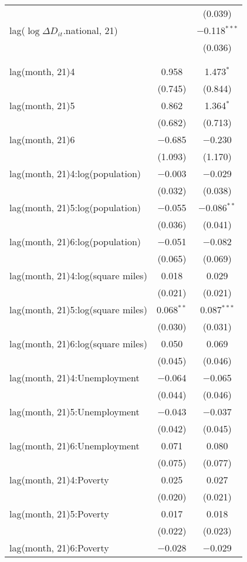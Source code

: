 \begin{tabular}{@{\extracolsep{1pt}}lcc}
  &  & (0.039) \\ 
  lag($\log \Delta D_{it}$.national, 21) &  & $-$0.118$^{***}$ \\ 
  &  & (0.036) \\ 
   &  &  \\ 
  &  &  \\ 
  lag(month, 21)4 & 0.958 & 1.473$^{*}$ \\ 
  & (0.745) & (0.844) \\ 
  lag(month, 21)5 & 0.862 & 1.364$^{*}$ \\ 
  & (0.682) & (0.713) \\ 
  lag(month, 21)6 & $-$0.685 & $-$0.230 \\ 
  & (1.093) & (1.170) \\ 
  lag(month, 21)4:log(population) & $-$0.003 & $-$0.029 \\ 
  & (0.032) & (0.038) \\ 
  lag(month, 21)5:log(population) & $-$0.055 & $-$0.086$^{**}$ \\ 
  & (0.036) & (0.041) \\ 
  lag(month, 21)6:log(population) & $-$0.051 & $-$0.082 \\ 
  & (0.065) & (0.069) \\ 
  lag(month, 21)4:log(square miles) & 0.018 & 0.029 \\ 
  & (0.021) & (0.021) \\ 
  lag(month, 21)5:log(square miles) & 0.068$^{**}$ & 0.087$^{***}$ \\ 
  & (0.030) & (0.031) \\ 
  lag(month, 21)6:log(square miles) & 0.050 & 0.069 \\ 
  & (0.045) & (0.046) \\ 
  lag(month, 21)4:Unemployment & $-$0.064 & $-$0.065 \\ 
  & (0.044) & (0.046) \\ 
  lag(month, 21)5:Unemployment & $-$0.043 & $-$0.037 \\ 
  & (0.042) & (0.045) \\ 
  lag(month, 21)6:Unemployment & 0.071 & 0.080 \\ 
  & (0.075) & (0.077) \\ 
  lag(month, 21)4:Poverty & 0.025 & 0.027 \\ 
  & (0.020) & (0.021) \\ 
  lag(month, 21)5:Poverty & 0.017 & 0.018 \\ 
  & (0.022) & (0.023) \\ 
  lag(month, 21)6:Poverty & $-$0.028 & $-$0.029 \\ 

\end{tabular}
